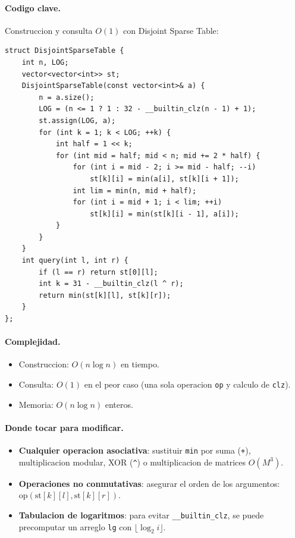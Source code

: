 \paragraph{Codigo clave.}
Construccion y consulta $O(1)$ con Disjoint Sparse Table:
\begin{verbatim}
struct DisjointSparseTable {
    int n, LOG;
    vector<vector<int>> st;
    DisjointSparseTable(const vector<int>& a) {
        n = a.size();
        LOG = (n <= 1 ? 1 : 32 - __builtin_clz(n - 1) + 1);
        st.assign(LOG, a);
        for (int k = 1; k < LOG; ++k) {
            int half = 1 << k;
            for (int mid = half; mid < n; mid += 2 * half) {
                for (int i = mid - 2; i >= mid - half; --i)
                    st[k][i] = min(a[i], st[k][i + 1]);
                int lim = min(n, mid + half);
                for (int i = mid + 1; i < lim; ++i)
                    st[k][i] = min(st[k][i - 1], a[i]);
            }
        }
    }
    int query(int l, int r) {
        if (l == r) return st[0][l];
        int k = 31 - __builtin_clz(l ^ r);
        return min(st[k][l], st[k][r]);
    }
};
\end{verbatim}

\paragraph{Complejidad.}
\begin{itemize}\setlength\itemsep{0pt}
	\item Construccion: $O(n \log n)$ en tiempo.
	\item Consulta: $O(1)$ en el peor caso (una sola operacion \texttt{op} y calculo de \texttt{clz}).
	\item Memoria: $O(n \log n)$ enteros.
\end{itemize}

\paragraph{Donde tocar para modificar.}
\begin{itemize}\setlength\itemsep{0pt}
	\item \textbf{Cualquier operacion asociativa}: sustituir \texttt{min} por suma (\texttt{+}), multiplicacion modular, XOR (\texttt{\^{}}) o multiplicacion de matrices $O(M^3)$.
	\item \textbf{Operaciones no conmutativas}: asegurar el orden de los argumentos: $\text{op}(\text{st}[k][l], \text{st}[k][r])$.
	\item \textbf{Tabulacion de logaritmos}: para evitar \verb|__builtin_clz|, se puede precomputar un arreglo \texttt{lg} con $\lfloor \log_2 i \rfloor$.
\end{itemize}

